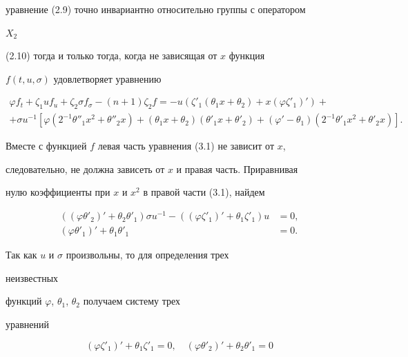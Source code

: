 уравнение (2.9) точно инвариантно относительно группы с оператором


$X_2$


(2.10) тогда и только тогда, когда не зависящая от $x$ функция


$f(t,u,\sigma)$ удовлетворяет уравнению


\begin{multline}


\varphi f_t+\zeta_1uf_u +\zeta_2\sigma f_\sigma-


(n+1)\zeta_2f = -u(\zeta'_1(\theta_1x+\theta_2)


+x(\varphi\zeta'_1)')+ \\


+\sigma u^{-1}[\varphi(2^{-1}\theta''_1x^2+\theta''_2x)+


(\theta_1x+\theta_2)(\theta'_1x+\theta'_2)+


(\varphi'-\theta_1)(2^{-1}\theta'_1x^2+\theta'_2x)].\tag{3.1}


\end{multline}


Вместе с функцией $f$ левая часть уравнения (3.1) не зависит от $x$,


следовательно, не должна зависеть от $x$ и правая часть. Приравнивая


нулю коэффициенты при $x$ и $x^2$ в правой части (3.1), найдем


\begin{align}


((\varphi\theta'_2)'+\theta_2\theta'_1)\sigma u^{-1}-


((\varphi\zeta'_1)'+\theta_1\zeta'_1)u&=0, \tag{3.2}\\


(\varphi\theta'_1)'+\theta_1\theta'_1&=0. \tag{3.3}


\end{align}


Так как $u$ и $\sigma$ произвольны, то для определения трех


неизвестных


функций $\varphi$, $\theta_1$, $\theta_2$ получаем систему трех


уравнений


\begin{equation}


(\varphi\zeta'_1)'+\theta_1\zeta'_1=0,\quad


(\varphi\theta'_2)'+\theta_2\theta'_1=0 \tag{3.4}


\end{equation}


